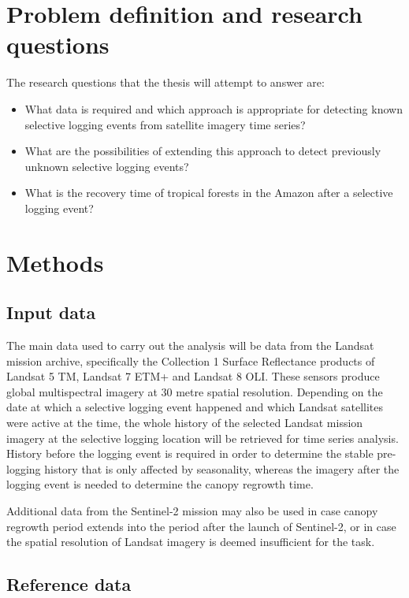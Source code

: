 \documentclass[a4paper,10pt]{article}
\begin{document}
\section{Problem definition and research questions}

The research questions that the thesis will attempt to answer are:

\begin{itemize}
 \item What data is required and which approach is appropriate for detecting known selective logging events from satellite imagery time series?
 \item What are the possibilities of extending this approach to detect previously unknown selective logging events?
 \item What is the recovery time of tropical forests in the Amazon after a selective logging event?
\end{itemize}

\section{Methods}

\subsection{Input data}

The main data used to carry out the analysis will be data from the Landsat mission archive, specifically the Collection 1 Surface Reflectance products of Landsat 5 \ac{TM}, Landsat 7 \ac{ETM+} and Landsat 8 {OLI}. These sensors produce global multispectral imagery at 30 metre spatial resolution. Depending on the date at which a selective logging event happened and which Landsat satellites were active at the time, the whole history of the selected Landsat mission imagery at the selective logging location will be retrieved for time series analysis. History before the logging event is required in order to determine the stable pre-logging history that is only affected by seasonality, whereas the imagery after the logging event is needed to determine the canopy regrowth time.

Additional data from the Sentinel-2 mission may also be used in case canopy regrowth period extends into the period after the launch of Sentinel-2, or in case the spatial resolution of Landsat imagery is deemed insufficient for the task.

\subsection{Reference data}
\end{document}
